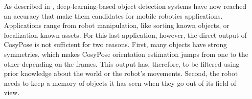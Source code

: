 


As described in , deep-learning-based object detection systems have now reached an accuracy that make them candidates for mobile robotics applications.
Applications range from robot manipulation, like sorting known objects, or localization \wrt known assets. For this last application, however,
the direct output of CosyPose is not sufficient for two reasons. First, many objects have strong symmetries, which makes CosyPose orientation estimation jumps from one to the other
depending on the frames. This output has, therefore, to be filtered using prior knowledge about the world or the robot's movements. Second, the robot needs to keep
a memory of objects it has seen when they go out of its field of view.

